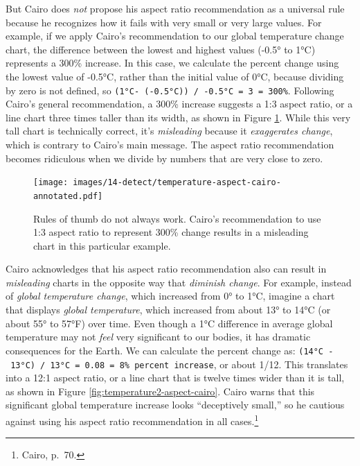 \documentclass[
  english,
]{book}
\begin{document}
But Cairo does \emph{not} propose his aspect ratio recommendation as a universal rule because he recognizes how it fails with very small or very large values. For example, if we apply Cairo's recommendation to our global temperature change chart, the difference between the lowest and highest values (-0.5° to 1°C) represents a 300\% increase. In this case, we calculate the percent change using the lowest value of -0.5°C, rather than the initial value of 0°C, because dividing by zero is not defined, so \texttt{(1°C-\ (-0.5°C))\ /\ \textbar{}-0.5°C\textbar{}\ =\ 3\ =\ 300\%}. Following Cairo's general recommendation, a 300\% increase suggests a 1:3 aspect ratio, or a line chart three times taller than its width, as shown in Figure \ref{fig:temperature-aspect-cairo}. While this very tall chart is technically correct, it's \emph{misleading} because it \emph{exaggerates change}, which is contrary to Cairo's main message. The aspect ratio recommendation becomes ridiculous when we divide by numbers that are very close to zero.



\begin{figure}
\centering
\texttt{[image: images/14-detect/temperature-aspect-cairo-annotated.pdf]}
\caption{\label{fig:temperature-aspect-cairo}Rules of thumb do not always work. Cairo's recommendation to use 1:3 aspect ratio to represent 300\% change results in a misleading chart in this particular example.}
\end{figure}

Cairo acknowledges that his aspect ratio recommendation also can result in \emph{misleading} charts in the opposite way that \emph{diminish change}. For example, instead of \emph{global temperature change}, which increased from 0° to 1°C, imagine a chart that displays \emph{global temperature}, which increased from about 13° to 14°C (or about 55° to 57°F) over time. Even though a 1°C difference in average global temperature may not \emph{feel} very significant to our bodies, it has dramatic consequences for the Earth. We can calculate the percent change as: \texttt{(14°C\ -\ 13°C)\ /\ 13°C\ =\ 0.08\ =\ 8\%\ percent\ increase}, or about 1/12. This translates into a 12:1 aspect ratio, or a line chart that is twelve times wider than it is tall, as shown in Figure \ref{fig:temperature2-aspect-cairo}. Cairo warns that this significant global temperature increase looks ``deceptively small,'' so he cautious against using his aspect ratio recommendation in all cases.\footnote{Cairo{}, p.~70.}
\end{document}
